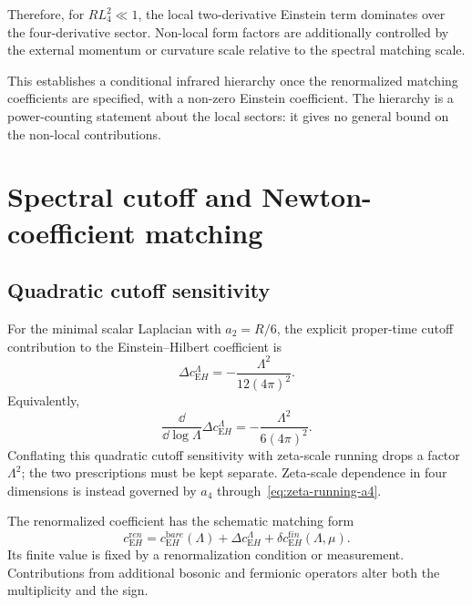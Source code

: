 \documentclass[pdflatex,sn-mathphys-num]{sn-jnl} %
\theoremstyle{remark}
\theoremstyle{plain}
\begin{document}
    Therefore, for $R L_4^2\ll1$,
    the local two-derivative Einstein term dominates over the
    four-derivative sector.
    Non-local form factors are additionally controlled by the external momentum or curvature scale relative to the
    spectral matching scale.

    This establishes a conditional infrared hierarchy once the renormalized matching coefficients are specified,
    with a non-zero Einstein coefficient.
    The hierarchy is a power-counting statement about the local sectors: it gives no general bound on the non-local
    contributions.

  \section{Spectral cutoff and Newton-coefficient matching}
  \label{sec:newton-identification}

  \subsection{Quadratic cutoff sensitivity}
    \label{subsec:running}

    For the minimal scalar Laplacian with $a_2=R/6$, the explicit proper-time cutoff contribution to the
    Einstein--Hilbert coefficient is
    \begin{equation}
      \Delta c_{\mathrm EH}^{\Lambda}
      =
      -\frac{\Lambda^2}{12(4\pi)^2}.
      \label{eq:cEH-cutoff}
    \end{equation}
    Equivalently,
    \begin{equation}
      \frac{\dd}{\dd\log\Lambda}
      \Delta c_{\mathrm EH}^{\Lambda}
      =
      -\frac{\Lambda^2}{6(4\pi)^2}.
      \label{eq:cEH-cutoff-running}
    \end{equation}
    Conflating this quadratic cutoff sensitivity with zeta-scale running drops a factor $\Lambda^2$; the two
    prescriptions must be kept separate.
    Zeta-scale dependence in four dimensions is instead governed by $a_4$ through~\eqref{eq:zeta-running-a4}.

    The renormalized coefficient has the schematic matching form
    \begin{equation}
      c_{\mathrm EH}^{\mathrm ren}
      =
      c_{\mathrm EH}^{\mathrm bare}(\Lambda)
      +\Delta c_{\mathrm EH}^{\Lambda}
      +\delta c_{\mathrm EH}^{\mathrm fin}(\Lambda,\mu).
      \label{eq:cEH-renormalized}
    \end{equation}
    Its finite value is fixed by a renormalization condition or measurement.
    Contributions from additional bosonic and fermionic operators alter both the multiplicity and the sign.
\end{document}
